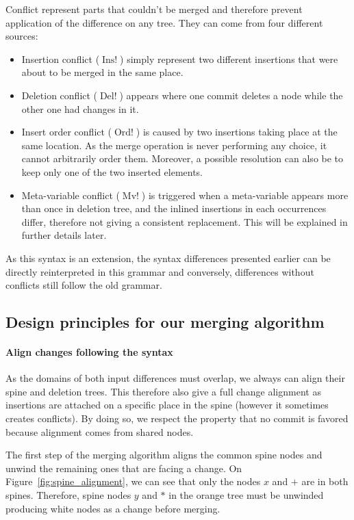 \documentclass[a4paper,11pt]{article}
\DeclareMathOperator\InsConflict{Ins!}
\DeclareMathOperator\DelConflict{Del!}
\DeclareMathOperator\OrdConflict{Ord!}
\DeclareMathOperator\MvConflict{Mv!}
\begin{document}
Conflict represent parts that couldn't be merged and therefore prevent
application of the difference on any tree. They can come from four different
sources:
\begin{itemize}
  \item Insertion conflict ($\InsConflict$) simply represent two different
insertions that were about to be merged in the same place.
  \item Deletion conflict ($\DelConflict$) appears where one commit deletes a
node while the other one had changes in it.
  \item Insert order conflict ($\OrdConflict$) is caused by two insertions
taking place at the same location. As the merge operation is never performing
any choice, it cannot arbitrarily order them. Moreover, a possible resolution
can also be to keep only one of the two inserted elements.
  \item Meta-variable conflict ($\MvConflict$) is triggered when a meta-variable
appears more than once in deletion tree, and the inlined insertions in each
occurrences differ, therefore not giving a consistent replacement. This will be
explained in further details later.
\end{itemize}

As this syntax is an extension, the syntax differences presented earlier can be
directly reinterpreted in this grammar and conversely, differences without
conflicts still follow the old grammar.

\subsection{Design principles for our merging algorithm}
\label{sec:merge_principles}
\paragraph{Align changes following the syntax}
As the domains of both input differences must overlap, we always can align their
spine and deletion trees. This therefore also give a full change alignment as
insertions are attached on a specific place in the spine (however it sometimes
creates conflicts). By doing so, we respect the property that no commit is
favored because alignment comes from shared nodes.

The first step of the merging algorithm aligns the common spine nodes and unwind
the remaining ones that are facing a change. On
Figure~\ref{fig:spine_alignment}, we can see that only the nodes $x$ and $+$ are
in both spines. Therefore, spine nodes $y$ and $*$ in the orange tree must be
unwinded producing white nodes as a change before merging.
\end{document}
